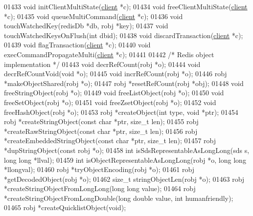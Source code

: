 \begin{DoxyCode}
{{{{{{{01433 \textcolor{keywordtype}{void} initClientMultiState(\hyperlink{structclient}{client} *c);
01434 \textcolor{keywordtype}{void} freeClientMultiState(\hyperlink{structclient}{client} *c);
01435 \textcolor{keywordtype}{void} queueMultiCommand(\hyperlink{structclient}{client} *c);
01436 \textcolor{keywordtype}{void} touchWatchedKey(redisDb *db, robj *key);
01437 \textcolor{keywordtype}{void} touchWatchedKeysOnFlush(\textcolor{keywordtype}{int} dbid);
01438 \textcolor{keywordtype}{void} discardTransaction(\hyperlink{structclient}{client} *c);
01439 \textcolor{keywordtype}{void} flagTransaction(\hyperlink{structclient}{client} *c);
01440 \textcolor{keywordtype}{void} execCommandPropagateMulti(\hyperlink{structclient}{client} *c);
01441 
01442 \textcolor{comment}{/* Redis object implementation */}
01443 \textcolor{keywordtype}{void} decrRefCount(robj *o);
01444 \textcolor{keywordtype}{void} decrRefCountVoid(\textcolor{keywordtype}{void} *o);
01445 \textcolor{keywordtype}{void} incrRefCount(robj *o);
01446 robj *makeObjectShared(robj *o);
01447 robj *resetRefCount(robj *obj);
01448 \textcolor{keywordtype}{void} freeStringObject(robj *o);
01449 \textcolor{keywordtype}{void} freeListObject(robj *o);
01450 \textcolor{keywordtype}{void} freeSetObject(robj *o);
01451 \textcolor{keywordtype}{void} freeZsetObject(robj *o);
01452 \textcolor{keywordtype}{void} freeHashObject(robj *o);
01453 robj *createObject(\textcolor{keywordtype}{int} type, \textcolor{keywordtype}{void} *ptr);
01454 robj *createStringObject(\textcolor{keyword}{const} \textcolor{keywordtype}{char} *ptr, size\_t len);
01455 robj *createRawStringObject(\textcolor{keyword}{const} \textcolor{keywordtype}{char} *ptr, size\_t len);
01456 robj *createEmbeddedStringObject(\textcolor{keyword}{const} \textcolor{keywordtype}{char} *ptr, size\_t len);
01457 robj *dupStringObject(\textcolor{keyword}{const} robj *o);
01458 \textcolor{keywordtype}{int} isSdsRepresentableAsLongLong(sds s, \textcolor{keywordtype}{long} \textcolor{keywordtype}{long} *llval);
01459 \textcolor{keywordtype}{int} isObjectRepresentableAsLongLong(robj *o, \textcolor{keywordtype}{long} \textcolor{keywordtype}{long} *llongval);
01460 robj *tryObjectEncoding(robj *o);
01461 robj *getDecodedObject(robj *o);
01462 size\_t stringObjectLen(robj *o);
01463 robj *createStringObjectFromLongLong(\textcolor{keywordtype}{long} \textcolor{keywordtype}{long} value);
01464 robj *createStringObjectFromLongDouble(\textcolor{keywordtype}{long} \textcolor{keywordtype}{double} value, \textcolor{keywordtype}{int} humanfriendly);
01465 robj *createQuicklistObject(\textcolor{keywordtype}{void});
}}}}}}}
\end{DoxyCode}
